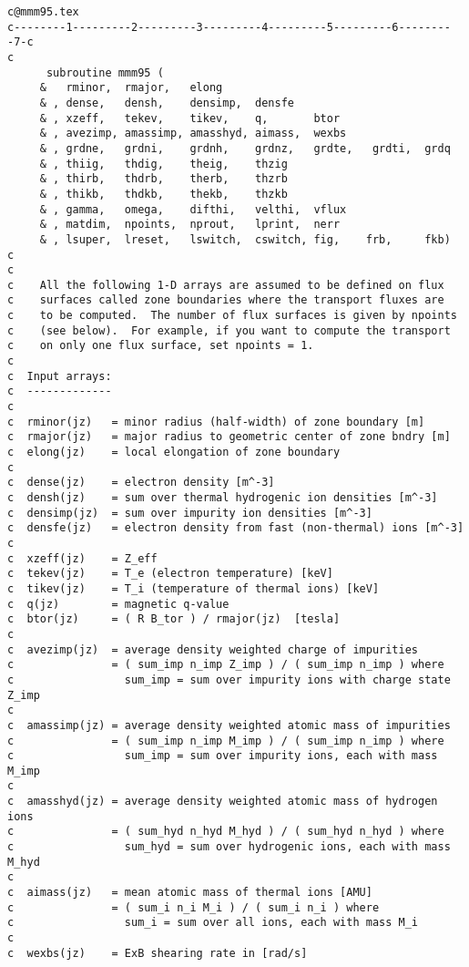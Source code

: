 \begin{verbatim}
c@mmm95.tex
c--------1---------2---------3---------4---------5---------6---------7-c
c
      subroutine mmm95 (
     &   rminor,  rmajor,   elong
     & , dense,   densh,    densimp,  densfe
     & , xzeff,   tekev,    tikev,    q,       btor
     & , avezimp, amassimp, amasshyd, aimass,  wexbs
     & , grdne,   grdni,    grdnh,    grdnz,   grdte,   grdti,  grdq
     & , thiig,   thdig,    theig,    thzig
     & , thirb,   thdrb,    therb,    thzrb
     & , thikb,   thdkb,    thekb,    thzkb
     & , gamma,   omega,    difthi,   velthi,  vflux
     & , matdim,  npoints,  nprout,   lprint,  nerr
     & , lsuper,  lreset,   lswitch,  cswitch, fig,    frb,     fkb)
c
c
c    All the following 1-D arrays are assumed to be defined on flux
c    surfaces called zone boundaries where the transport fluxes are
c    to be computed.  The number of flux surfaces is given by npoints
c    (see below).  For example, if you want to compute the transport
c    on only one flux surface, set npoints = 1.
c
c  Input arrays:
c  -------------
c
c  rminor(jz)   = minor radius (half-width) of zone boundary [m]
c  rmajor(jz)   = major radius to geometric center of zone bndry [m]
c  elong(jz)    = local elongation of zone boundary
c
c  dense(jz)    = electron density [m^-3]
c  densh(jz)    = sum over thermal hydrogenic ion densities [m^-3]
c  densimp(jz)  = sum over impurity ion densities [m^-3]
c  densfe(jz)   = electron density from fast (non-thermal) ions [m^-3]
c
c  xzeff(jz)    = Z_eff
c  tekev(jz)    = T_e (electron temperature) [keV] 
c  tikev(jz)    = T_i (temperature of thermal ions) [keV]
c  q(jz)        = magnetic q-value
c  btor(jz)     = ( R B_tor ) / rmajor(jz)  [tesla]
c
c  avezimp(jz)  = average density weighted charge of impurities
c               = ( sum_imp n_imp Z_imp ) / ( sum_imp n_imp ) where
c                 sum_imp = sum over impurity ions with charge state Z_imp
c
c  amassimp(jz) = average density weighted atomic mass of impurities
c               = ( sum_imp n_imp M_imp ) / ( sum_imp n_imp ) where 
c                 sum_imp = sum over impurity ions, each with mass M_imp
c
c  amasshyd(jz) = average density weighted atomic mass of hydrogen ions
c               = ( sum_hyd n_hyd M_hyd ) / ( sum_hyd n_hyd ) where
c                 sum_hyd = sum over hydrogenic ions, each with mass M_hyd
c
c  aimass(jz)   = mean atomic mass of thermal ions [AMU]
c               = ( sum_i n_i M_i ) / ( sum_i n_i ) where
c                 sum_i = sum over all ions, each with mass M_i
c
c  wexbs(jz)    = ExB shearing rate in [rad/s]

\end{verbatim}
